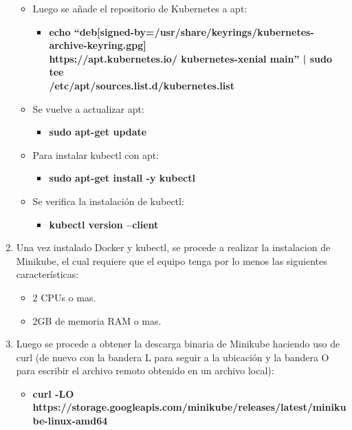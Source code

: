 \begin{enumerate}
\begin{itemize}
\begin{itemize}
        \end{itemize}
        \item Luego se añade el repositorio de Kubernetes a apt:
        \begin{itemize}
            \item \textbf{echo ``deb[signed-by=/usr/share/keyrings/kubernetes-archive-keyring.gpg]\\ https://apt.kubernetes.io/ kubernetes-xenial main'' | sudo tee\\ /etc/apt/sources.list.d/kubernetes.list}
        \end{itemize}
        \item Se vuelve a actualizar apt:
        \begin{itemize}
            \item \textbf{sudo apt-get update}
        \end{itemize}
        \item Para instalar kubectl con apt:
        \begin{itemize}
            \item \textbf{sudo apt-get install -y kubectl}
        \end{itemize}
        \item Se verifica la instalación de kubectl:
        \begin{itemize}
            \item \textbf{kubectl version --client}
        \end{itemize}
    \end{itemize}
    \item Una vez instalado Docker y kubectl, se procede a realizar la instalacion de Minikube, el cual requiere que el equipo tenga por lo menos las siguientes características:
    \begin{itemize}
        \item 2 CPUs o mas.
        \item 2GB de memoria RAM o mas.
    \end{itemize}
    \item Luego se procede a obtener la descarga binaria de Minikube haciendo uso de curl (de nuevo con la bandera L para seguir a la ubicación y la bandera O para escribir el archivo remoto obtenido en un archivo local):
    \begin{itemize}
        \item \textbf{curl -LO https://storage.googleapis.com/minikube/releases/latest/minikube-linux-amd64}
    \end{itemize}

\end{enumerate}
